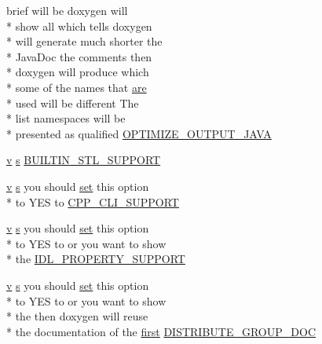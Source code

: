 \begin{DoxyCompactItemize}
brief will be doxygen will \\*
show all which tells doxygen \\*
will generate much shorter the \\*
Java\-Doc the comments then \\*
doxygen will produce which \\*
some of the names that \hyperlink{sdlgamepad_8dox_a6d0965b20c4eb2235e8f9f5f0e5193ae}{are} \\*
used will be different The \\*
list namespaces will be \\*
presented as qualified \hyperlink{sdlgamepad_8dox_afd2bb55c95bb3cedff4f1baa0d0f09e1}{O\-P\-T\-I\-M\-I\-Z\-E\-\_\-\-O\-U\-T\-P\-U\-T\-\_\-\-J\-A\-V\-A}
\item 
\hyperlink{glext_8h_a14cfbe2fc2234f5504618905b69d1e06}{v} \hyperlink{glext_8h_ad585a1393cfa368fa9dc3d8ebff640d5}{s} \hyperlink{sdlgamepad_8dox_ab43c02f50185eae26e7fdfe802989f59}{B\-U\-I\-L\-T\-I\-N\-\_\-\-S\-T\-L\-\_\-\-S\-U\-P\-P\-O\-R\-T}
\item 
\hyperlink{glext_8h_a14cfbe2fc2234f5504618905b69d1e06}{v} \hyperlink{glext_8h_ad585a1393cfa368fa9dc3d8ebff640d5}{s} you should \hyperlink{analyze_raw_8m_a11671e12e7b3fc5881313758d6cc0b45}{set} this option \\*
to Y\-E\-S to \hyperlink{sdlgamepad_8dox_ad95e419f1790fce508581809c7b5dd7f}{C\-P\-P\-\_\-\-C\-L\-I\-\_\-\-S\-U\-P\-P\-O\-R\-T}
\item 
\hyperlink{glext_8h_a14cfbe2fc2234f5504618905b69d1e06}{v} \hyperlink{glext_8h_ad585a1393cfa368fa9dc3d8ebff640d5}{s} you should \hyperlink{analyze_raw_8m_a11671e12e7b3fc5881313758d6cc0b45}{set} this option \\*
to Y\-E\-S to or you want to show \\*
the \hyperlink{sdlgamepad_8dox_a09c760dfd058001a9247df20dd282ea2}{I\-D\-L\-\_\-\-P\-R\-O\-P\-E\-R\-T\-Y\-\_\-\-S\-U\-P\-P\-O\-R\-T}
\item 
\hyperlink{glext_8h_a14cfbe2fc2234f5504618905b69d1e06}{v} \hyperlink{glext_8h_ad585a1393cfa368fa9dc3d8ebff640d5}{s} you should \hyperlink{analyze_raw_8m_a11671e12e7b3fc5881313758d6cc0b45}{set} this option \\*
to Y\-E\-S to or you want to show \\*
the then doxygen will reuse \\*
the documentation of the \hyperlink{glext_8h_a970a385f6f880f2b620451db4ca4299a}{first} \hyperlink{sdlgamepad_8dox_a2d6cc054818b29cdad766ec1e51d30f0}{D\-I\-S\-T\-R\-I\-B\-U\-T\-E\-\_\-\-G\-R\-O\-U\-P\-\_\-\-D\-O\-C}

\end{DoxyCompactItemize}
